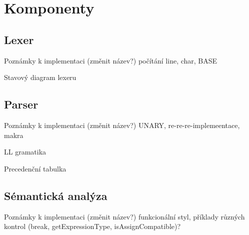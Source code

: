 \documentclass[13pt]{beamer}
\begin{document}
\section{Komponenty}
\subsection{Lexer}

\begin{frame}{Poznámky k implementaci (změnit název?)}
počítání line, char, BASE
\end{frame}

\begin{frame}{Stavový diagram lexeru}
\begin{center}
\end{center}
\end{frame}

\subsection{Parser}

\begin{frame}{Poznámky k implementaci (změnit název?)}
UNARY, re-re-re-implemeentace, makra
\end{frame}

\begin{frame}{LL gramatika}
\end{frame}

\begin{frame}{Precedenční tabulka}
\end{frame}

\subsection{Sémantická analýza}

\begin{frame}{Poznámky k implementaci (změnit název?)}
funkcionální styl, příklady různých kontrol (break, getExpressionType, isAssignCompatible)?
\end{frame}
\end{document}

